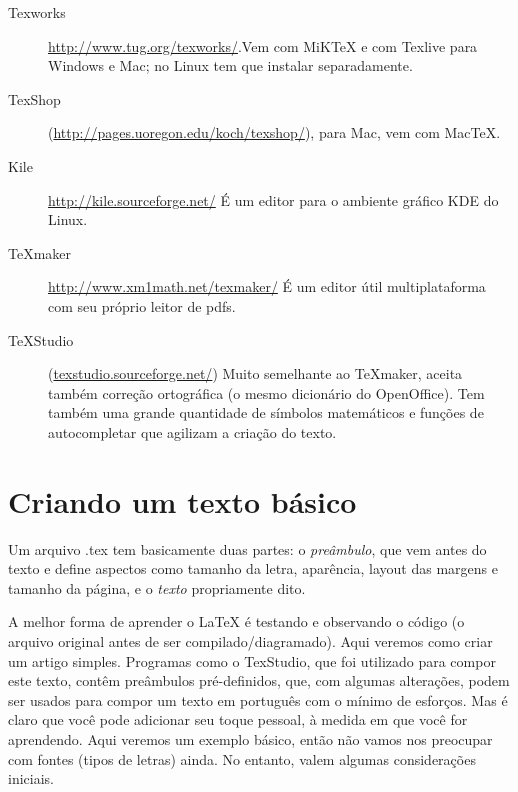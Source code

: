 \documentclass[a4paper,numbers=noenddot,abstract,DIV=calc]{scrbook} %
\begin{document}
\begin{description}

\item[Texworks] \url{http://www.tug.org/texworks/}.Vem com MiKTeX e com Texlive para Windows e Mac; no Linux tem que instalar separadamente. 

\item [TexShop] (\url{http://pages.uoregon.edu/koch/texshop/}), para Mac, vem com MacTeX.

\item [Kile] \url{http://kile.sourceforge.net/}
É um editor para o ambiente gráfico KDE do Linux.

\item [TeXmaker] \url{http://www.xm1math.net/texmaker/}
É um editor útil multiplataforma com seu próprio leitor de pdfs.

\item  [TeXStudio] (\url{texstudio.sourceforge.net/})
Muito semelhante ao TeXmaker, aceita também correção ortográfica (o mesmo dicionário do OpenOffice). Tem também uma grande quantidade de símbolos matemáticos e funções de autocompletar que agilizam a criação do texto.

\end{description}

\chapter{Criando um texto básico}

Um arquivo .tex tem basicamente duas partes: o \textit{preâmbulo}, que vem antes do texto e define aspectos como tamanho da letra, aparência, layout das margens e tamanho da página, e o \textit{texto} propriamente dito.

A melhor forma de aprender o \LaTeX{} é testando e observando o código (o arquivo original antes de ser compilado/diagramado). Aqui veremos como criar um artigo simples. Programas como o TexStudio, que foi utilizado para compor este texto, contêm preâmbulos pré-definidos, que, com algumas alterações, podem ser usados para compor um texto em português com o mínimo de esforços. Mas é claro que você pode adicionar seu toque pessoal, à medida em que você for aprendendo. Aqui veremos um exemplo básico, então não vamos nos preocupar com fontes (tipos de letras) ainda. No entanto, valem algumas considerações iniciais.
\end{document}
